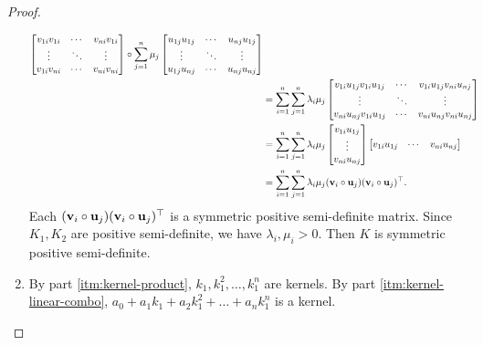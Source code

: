 \begin{proof}
\begin{enumerate}
\begin{align*}
            \begin{bmatrix}
                v_{1i} v_{1i} & \cdots & v_{ni} v_{1i} \\
                \vdots & \ddots & \vdots\\
                v_{1i} v_{ni} & \cdots & v_{ni} v_{ni}\\
            \end{bmatrix} \circ
            \sum_{j=1}^{n} \mu_{j}
            \begin{bmatrix}
                u_{1j} u_{1j} & \cdots & u_{nj} u_{1j} \\
                \vdots & \ddots & \vdots\\
                u_{1j} u_{nj} & \cdots & u_{nj} u_{nj}\\
            \end{bmatrix}\\
            &= \sum_{i=1}^{n} \sum_{j=1}^{n} \lambda_{i} \mu_{j}
            \begin{bmatrix}
                v_{1i} u_{1j} v_{1i} u_{1j} & \cdots & v_{1i} u_{1j} v_{ni} u_{nj} \\
                \vdots & \ddots & \vdots\\
                v_{ni} u_{nj} v_{1i} u_{1j} & \cdots & v_{ni} u_{nj} v_{ni}  u_{nj}
            \end{bmatrix}\\
            &= \sum_{i=1}^{n} \sum_{j=1}^{n} \lambda_{i} \mu_{j}
            \begin{bmatrix}
                v_{1i} u_{1j} \\ \vdots \\ v_{ni} u_{nj}
            \end{bmatrix}
            \begin{bmatrix}
                v_{1i} u_{1j} & \cdots & v_{ni} u_{nj}
            \end{bmatrix}\\
            &= \sum_{i=1}^{n} \sum_{j=1}^{n} \lambda_{i} \mu_{j}
            (\mathbf{v}_i \circ \mathbf{u}_j) (\mathbf{v}_i \circ \mathbf{u}_j)^\top.
        \end{align*}
        Each \((\mathbf{v}_i \circ \mathbf{u}_j) (\mathbf{v}_i \circ \mathbf{u}_j)^\top\) is a symmetric positive semi-definite matrix.
        Since \(K_1, K_2\) are positive semi-definite, we have \(\lambda_i, \mu_i > 0\).
        Then \(K\) is symmetric positive semi-definite.
        \item By part \ref{itm:kernel-product}, \(k_1, k_1^2, \dots, k_1^n\) are kernels.
        By part \ref{itm:kernel-linear-combo}, \(a_0 + a_1 k_1 + a_2 k_1^2 + \dots + a_n k_1^n\) is a kernel.

\end{enumerate}
\end{proof}
